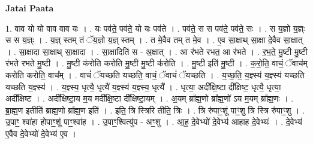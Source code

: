 \documentclass[17pt]{extarticle}
\begin{document}
\textbf{Jatai Paata} \newline

1. वाव यो यो वाव वाव यः । . यः पव॑ते॒ पव॑ते॒ यो यः पव॑ते । . पव॑ते॒ स स पव॑ते॒ पव॑ते॒ सः । . स य॒ज्ञो य॒ज्ञ्ः स स य॒ज्ञ्ः । . य॒ज्ञ् स्तम् तं ॅय॒ज्ञो य॒ज्ञ् स्तम् । . त मे॒वैव तम् त मे॒व । . ए॒व सा॒क्षाथ् सा॒क्षा दे॒वैव सा॒क्षात् । . सा॒क्षादा सा॒क्षाथ् सा॒क्षादा । . सा॒क्षादिति॑ स - अ॒क्षात् । . आ र॑भते रभत॒ आ र॑भते । . र॒भ॒ते॒ मु॒ष्टी मु॒ष्टी र॑भते रभते मु॒ष्टी । . मु॒ष्टी क॑रोति करोति मु॒ष्टी मु॒ष्टी क॑रोति । . मु॒ष्टी इति॑ मु॒ष्टी । . क॒रो॒ति॒ वाचं॒ ॅवाच॑म् करोति करोति॒ वाच᳚म् । . वाचं॑ ॅयच्छति यच्छति॒ वाचं॒ ॅवाचं॑ ॅयच्छति । . य॒च्छ॒ति॒ य॒ज्ञ्स्य॑ य॒ज्ञ्स्य॑ यच्छति यच्छति य॒ज्ञ्स्य॑ । . य॒ज्ञ्स्य॒ धृत्यै॒ धृत्यै॑ य॒ज्ञ्स्य॑ य॒ज्ञ्स्य॒ धृत्यै᳚ । . धृत्या॒ अदी᳚क्षि॒ष्टा दी᳚क्षिष्ट॒ धृत्यै॒ धृत्या॒ अदी᳚क्षिष्ट । . अदी᳚क्षिष्टा॒य म॒य मदी᳚क्षि॒ष्टा दी᳚क्षिष्टा॒यम् । . अ॒यम् ब्रा᳚ह्म॒णो ब्रा᳚ह्म॒णो॑ ऽय म॒यम् ब्रा᳚ह्म॒णः । . ब्रा॒ह्म॒ण इतीति॑ ब्राह्म॒णो ब्रा᳚ह्म॒ण इति॑ । . इति॒ त्रि स्त्रिरि तीति॒ त्रिः । . त्रि रु॑पाꣳ॒॒शू॑ पाꣳ॒॒शु त्रि स्त्रि रु॑पाꣳ॒॒शु । . उ॒पाꣳ॒॒ श्वा॑हा होपाꣳ॒॒शू॑ पाꣳ॒॒श्वा॑ह । . उ॒पाꣳ॒॒श्वित्यु॑प - अꣳ॒॒शु । . आ॒ह॒ दे॒वेभ्यो॑ दे॒वेभ्य॑ आहाह दे॒वेभ्यः॑ । . दे॒वेभ्य॑ ए॒वैव दे॒वेभ्यो॑ दे॒वेभ्य॑ ए॒व । \newline
\end{document}
